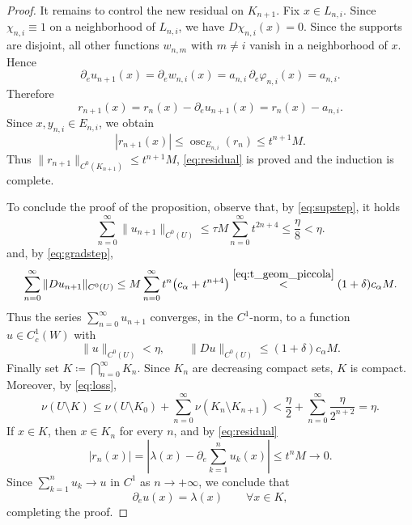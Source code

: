 \documentclass[10pt,a4paper]{amsart}
\newcommand{\osc}{\operatorname{osc}}
\begin{document}
\begin{proof}
It remains to control the new residual on $K_{n+1}$.
Fix $x\in L_{n,i}$.
Since $\chi_{n,i}\equiv 1$ on a neighborhood of $L_{n,i}$, we have $D\chi_{n,i}(x)=0$.
Since the supports are disjoint, all other functions $w_{n,m}$ with $m\neq i$ vanish in a neighborhood of $x$.
Hence
$$
\partial_e u_{n+1}(x)=\partial_e w_{n,i}(x)=a_{n,i}\,\partial_e\varphi_{n,i}(x)=a_{n,i}.
$$
Therefore
$$
r_{n+1}(x)=r_n(x)-\partial_e u_{n+1}(x)=r_n(x)-a_{n,i}.
$$
Since $x,y_{n,i}\in E_{n,i}$, we obtain
$$
|r_{n+1}(x)|
\le \osc_{E_{n,i}}(r_n)
\le t^{n+1}M.
$$
Thus $\|r_{n+1}\|_{C^0(K_{n+1})}\le t^{n+1}M$, \eqref{eq:residual} is proved and the induction is complete.

To conclude the proof of the proposition, observe that, by \eqref{eq:supstep}, it holds
$$
\sum_{n=0}^\infty \|u_{n+1}\|_{C^0(U)}
\le \tau M \sum_{n=0}^\infty t^{2n+4}
\le \frac{\eta}{8}
< \eta.
$$
and, by \eqref{eq:gradstep},
$$
\sum_{n=0}^\infty \|Du_{n+1}\|_{C^0(U)}
\le M\sum_{n=0}^\infty t^{n}\bigl(c_\alpha+t^{n+4}\bigr)
\overset{\eqref{eq:t_geom_piccola}}{<} (1+\delta)c_\alpha M.
$$
Thus the series $\sum_{n=0}^\infty u_{n+1}$ converges, in the $C^1$-norm, to a function $u \in C^1_c(W)$ with
$$
\|u\|_{C^0(U)} < \eta,
\qquad
\|Du\|_{C^0(U)}\le (1+\delta)c_\alpha M.
$$
Finally set $K\coloneqq \bigcap_{n=0}^\infty K_n$.
Since $K_n$ are decreasing compact sets, $K$ is compact.
Moreover, by \eqref{eq:loss},
$$
\nu(U\setminus K)
\le \nu(U\setminus K_0)+\sum_{n=0}^\infty \nu(K_n\setminus K_{n+1})
< \frac{\eta}{2}+\sum_{n=0}^\infty \frac{\eta}{2^{n+2}}
=\eta.
$$
If $x\in K$, then $x\in K_n$ for every $n$, and by \eqref{eq:residual}
$$
|r_n(x)|=\left|\lambda(x)-\partial_e \sum_{k=1}^{n}u_k(x)\right|\le t^{n}M\to 0.
$$
Since $\sum_{k=1}^{n}u_k\to u$ in $C^1$ as $n \to +\infty$, we conclude that
$$
\partial_e u(x)=\lambda(x)
\qquad\forall x\in K,
$$
completing the proof.
\end{proof}
\end{document}
